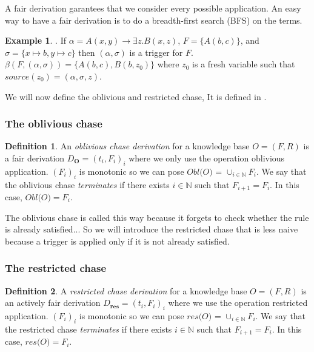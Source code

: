 \documentclass{article}
\theoremstyle{definition}
\newtheorem{definition}{Definition}[section]
\newtheorem{example}{Example}[section]
\theoremstyle{remark}
\def \N {\mathbb N}
\begin{document}
A fair derivation garantees that we consider every possible application. An easy way to have a fair derivation is to do a breadth-first search (BFS) on the terms.

\begin{example}. If $\alpha = A(x,y) \rightarrow \exists z.B(x,z)$, $F = \{A(b,c)\}$, and $\sigma = \{x \mapsto b, y \mapsto c \}$ then $(\alpha,\sigma)$ is a trigger for $F$. $\beta(F,(\alpha,\sigma)) = \{A(b,c),B(b,z_0)\}$ where $z_0$ is a fresh variable such that $\textit{source}(z_0)=(\alpha,\sigma,z)$.
\end{example}

We will now define the oblivious and restricted chase, It is defined in \cite{obl_res}.

\subsubsection{The oblivious chase}

\begin{definition}
An \emph{oblivious chase derivation} for a knowledge base $O= (F,R)$ is a fair derivation $D_{\textbf{O}} = (t_i,F_i)_{i} $ where we only use the operation oblivious application. $(F_i)_i$ is monotonic so we can pose \emph{$\textit{Obl(O)}$} = $\cup_{i \in \N}F_i$.
We say that the oblivious chase \emph{terminates} if there exists $i \in \N$ such that $F_{i+1} = F_i$. In this case, $\textit{Obl(O)} = F_i$.
\end{definition}


The oblivious chase is called this way because it forgets to check whether the rule is already satisfied... So we will introduce the restricted chase that is less naive because a trigger is applied only if it is not already satisfied.

\subsubsection{The restricted chase}

\begin{definition}
A \emph{restricted chase derivation} for a knowledge base $O= (F,R)$ is an actively fair derivation $D_{\textbf{res}} = (t_i,F_i)_{i} $ where we use the operation restricted application. $(F_i)_i$ is monotonic so we can pose \emph{$\textit{res(O)}$} = $\cup_{i \in \N}F_i$.
We say that the restricted chase \emph{terminates} if there exists $i \in \N$ such that $F_{i+1} = F_i$. In this case, $\textit{res(O)} = F_i$.
\end{definition}
\end{document}
